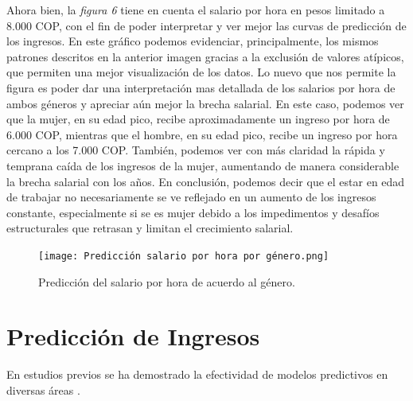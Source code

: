 \documentclass[10pt]{article}
\begin{document}
Ahora bien, la \textit{figura 6} tiene en cuenta el salario por hora en pesos limitado a 8.000 COP, con el fin de poder interpretar y ver mejor las curvas de predicción de los ingresos. En este gráfico podemos evidenciar, principalmente, los mismos patrones descritos en la anterior imagen gracias a la exclusión de valores atípicos, que permiten una mejor visualización de los datos. Lo nuevo que nos permite la figura es poder dar una interpretación mas detallada de los salarios por hora de ambos géneros y apreciar aún mejor la brecha salarial. En este caso, podemos ver que la mujer, en su edad pico, recibe aproximadamente un ingreso por hora de 6.000 COP, mientras que el hombre, en su edad pico, recibe un ingreso por hora cercano a los 7.000 COP. También, podemos ver con más claridad la rápida y temprana caída  de los ingresos de la mujer, aumentando de manera considerable la brecha salarial con los años. En conclusión, podemos decir que el estar en edad de trabajar no necesariamente se ve reflejado en un aumento de los ingresos constante, especialmente si se es mujer debido a los impedimentos y desafíos estructurales que retrasan y limitan el crecimiento salarial.

\begin{figure}[H]  
    \centering
    \texttt{[image: Predicción salario por hora por género.png]} %
    \caption{Predicción del salario por hora de acuerdo al género.}
    \label{fig: Gráfico 2}  %
\end{figure}




\section{Predicción de Ingresos}







En estudios previos se ha demostrado la efectividad de modelos predictivos en diversas áreas \cite{ferrer2019, echavarria2022}.


 




\end{document}
